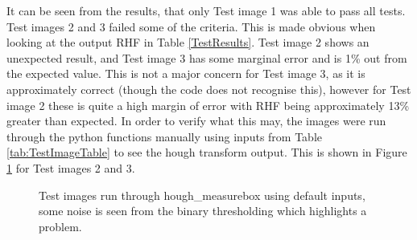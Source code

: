 \documentclass{article}
\begin{document}
    \noindent It can be seen from the results, that only Test image 1 was able to pass all tests. Test images 2 and 3 failed some of the criteria. This is made obvious when looking at the output RHF in Table \ref{TestResults}. Test image 2 shows an unexpected result, and Test image 3 has some marginal error and is 1\% out from the expected value. This is not a major concern for Test image 3, as it is approximately correct (though the code does not recognise this), however for Test image 2 these is quite a high margin of error with RHF being approximately 13\% greater than expected. In order to verify what this may, the images were run through the python functions manually using inputs from Table \ref{tab:TestImageTable} to see the hough transform output. This is shown in Figure \ref{TestImagesProcessed} for Test images 2 and 3.

    \begin{figure}[h]
        \centering
        \hfill
        \caption{Test images run through hough\_measurebox using default inputs, some noise is seen from the binary thresholding which highlights a problem.}
    \label{TestImagesProcessed}
    \end{figure}
\end{document}
